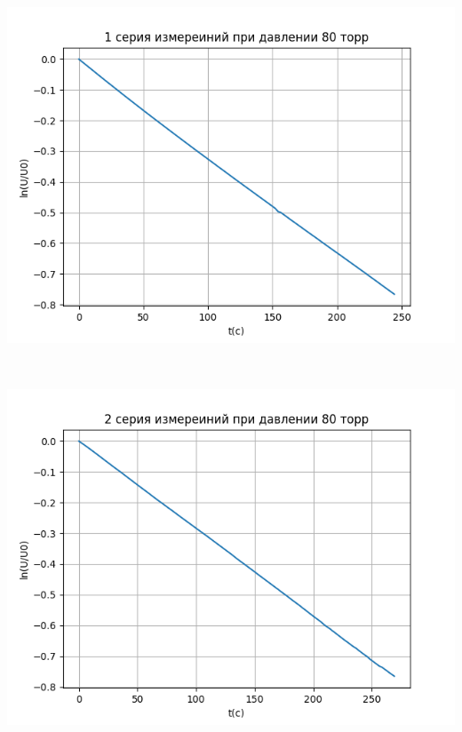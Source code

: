 \
\\
\begin{minipage}{0.47\textwidth}
  \includegraphics[width=1\linewidth]{pic/80_1.png}
\end{minipage}
\begin{minipage}{0.04\textwidth}
\
\end{minipage}
\begin{minipage}{0.47\textwidth}
 \includegraphics[width=1\linewidth]{pic/80_2.png}
\end{minipage}
\\
\
\\
\\

